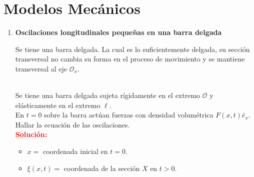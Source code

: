 \documentclass[../main]{subfiles}
\begin{document}
\section{Modelos Mecánicos}
\begin{enumerate}
    \item[] \textbf{Oscilaciones longitudinales pequeñas en una barra delgada}\\[0.5cm]
    \begin{minipage}{0.5\textwidth}
     Se tiene una barra delgada. La cual es lo suficientemente delgada, su sección transversal no cambia su forma en el proceso de movimiento y se mantiene transversal al eje $\mathcal{O}_x$.   
    \end{minipage}
    \begin{minipage}{0.5\textwidth}

    \end{minipage}
    \\[0.5cm]
    Se tiene una barra delgada sujeta rígidamente en el extremo $\mathcal{O}$ y elásticamente en el extremo $\ell$. \\
    En $t=0$ sobre la barra actúan fuerzas con densidad volumétrica $F(x,t)\hat{e}_x$. Hallar la ecuación de las oscilaciones. \\
    \textbf{\textcolor{red}{Solución:}}\\[0.5cm]
    \begin{minipage}{0.5\textwidth}
    \begin{itemize}
        \item $x =$  coordenada inicial en $t=0$.
        \item $\xi(x,t) =$ coordenada de la sección $X$ en $t>0$. 
    \end{itemize}
    \end{minipage}
    \begin{minipage}{0.5\textwidth}


\end{minipage}
\end{enumerate}
\end{document}
